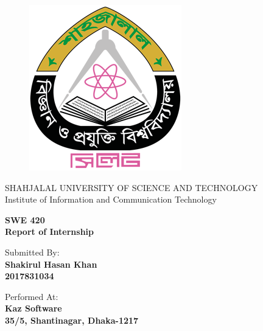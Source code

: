 \begin{titlepage}
\begin{figure}[!htb]
    \centering
    \includegraphics[keepaspectratio=true,scale=2]{images/Frontpage/sustlogo.png}
\end{figure}

\begin{center}
    \LARGE{SHAHJALAL UNIVERSITY OF SCIENCE AND TECHNOLOGY}
    \vspace{5mm}
    \\ \LARGE{Institute of Information and Communication Technology}
\end{center}

\vspace{15mm}
\begin{center}
    {\LARGE{\bf SWE 420\\ \vspace{5mm} Report of Internship }}
    
    
\end{center}
\vspace{30mm}

\begin{minipage}[t]{0.47\textwidth}
	{\large{Submitted By:}{\normalsize\vspace{3mm}
	\bf\\ \large{Shakirul Hasan Khan} \normalsize\vspace{2mm} \\ 2017831034}}
\end{minipage}
\hfill
\begin{minipage}[t]{0.47\textwidth}\raggedleft
	{\large{Performed At:}{\normalsize\vspace{3mm} \bf\\ \large{Kaz Software}\normalsize\vspace{2mm}\\ 35/5, Shantinagar, Dhaka-1217}}
\end{minipage}

\vspace{30mm}
\hrulefill
\\

\end{titlepage}